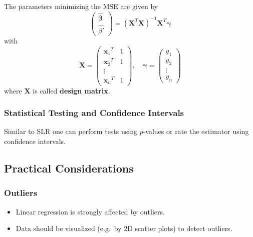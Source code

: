 
The parameters minimizing the MSE are given by
\begin{equation*}
    \begin{pmatrix}
        \hat{\boldsymbol{\beta}} \\
        \widehat{\beta'}
    \end{pmatrix}
    ={(\mathbf{X}^T \mathbf{X})}^{-1}\mathbf{X}^T\mathbf{\gamma}
\end{equation*}
with
\begin{equation*}
    \mathbf{X}=
    \begin{pmatrix}
        {\mathbf{x}_1}^T & 1 \\
        {\mathbf{x}_2}^T & 1 \\
        \vdots               \\
        {\mathbf{x}_n}^T & 1
    \end{pmatrix},\quad
    \mathbf{\gamma}=
    \begin{pmatrix}
        y_1    \\
        y_2    \\
        \vdots \\
        y_n
    \end{pmatrix}
\end{equation*}
where $\mathbf{X}$ is called \textbf{design matrix}.

\subsubsection{Statistical Testing and Confidence Intervals}
Similar to SLR one can perform tests using $p$-values or rate the estimator using confidence intervals.

\subsection{Practical Considerations}

\subsubsection{Outliers}
\begin{itemize}
    \item Linear regression is strongly affected by outliers.
    \item Data should be visualized (e.g.\ by 2D scatter plots) to detect outliers.
\end{itemize}

